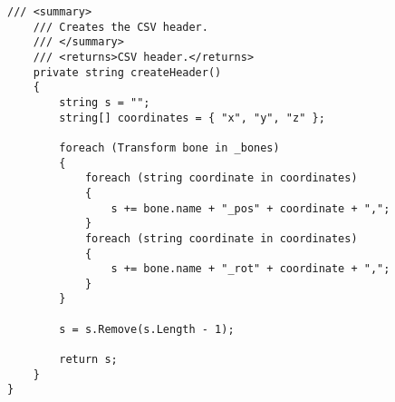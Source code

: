 \begin{lstlisting}[style=customcsharp, caption={Código de la herramienta MixamoDumper}, label={lst:MixamoDumperCode}]
    /// <summary>
    /// Creates the CSV header.
    /// </summary>
    /// <returns>CSV header.</returns>
    private string createHeader()
    {
        string s = "";
        string[] coordinates = { "x", "y", "z" };

        foreach (Transform bone in _bones)
        {
            foreach (string coordinate in coordinates)
            {
                s += bone.name + "_pos" + coordinate + ",";
            }
            foreach (string coordinate in coordinates)
            {
                s += bone.name + "_rot" + coordinate + ",";
            }
        }

        s = s.Remove(s.Length - 1);

        return s;
    }
}
\end{lstlisting}
